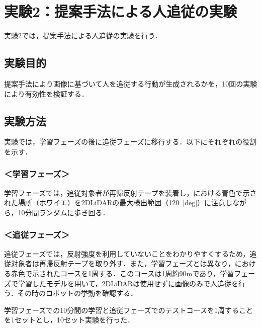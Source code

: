 \section{実験2：提案手法による人追従の実験}

  実験2では，提案手法による人追従の実験を行う．

\subsection{実験目的}

  提案手法により画像に基づいて人を追従する行動が生成されるかを，10回の実験により有効性を検証する．

\subsection{実験方法}

  実験では，学習フェーズの後に追従フェーズに移行する．以下にそれぞれの役割を示す．

  \subsubsection*{＜学習フェーズ＞}
  学習フェーズでは，追従対象者が再帰反射テープを装着し，における青色で示された場所（ホワイエ）を2DLiDARの最大検出範囲（120\, [deg]）に注意しながら，10分間ランダムに歩き回る．

  \subsubsection*{＜追従フェーズ＞}
  追従フェーズでは，反射強度を利用していないことをわかりやすくするため，追従対象者は再帰反射テープを取り外す．また，学習フェーズとは異なり，における赤色で示されたコースを1周する．このコースは1周約90mであり，学習フェーズで学習したモデルを用いて，2DLiDARは使用せずに画像のみで人追従を行う．その時のロボットの挙動を確認する．

  \vspace{1cm}

  学習フェーズでの10分間の学習と追従フェーズでのテストコースを1周することを1セットとし，10セット実験を行った．

\newpage

